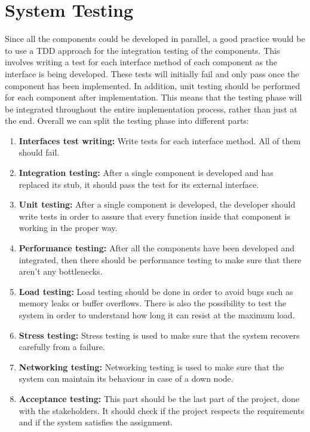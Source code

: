 \section{System Testing}
\label{sec:systemTesting}%
Since all the components could be developed in parallel, a good practice would be to use a TDD approach for the integration testing of the components. This involves writing a test for each interface method of each component as the interface is being developed. These tests will initially fail and only pass once the component has been implemented. In addition, unit testing should be performed for each component after implementation. This means that the testing phase will be integrated throughout the entire implementation process, rather than just at the end.
Overall we can split the testing phase into different parts:
\begin{enumerate}
    \item \textbf{Interfaces test writing: }Write tests for each interface method. All of them should fail.
    \item \textbf{Integration testing: }After a single component is developed and has replaced its stub, it should pass the test for its external interface.
    \item \textbf{Unit testing: }After a single component is developed, the developer should write tests in order to assure that every function inside that component is working in the proper way.
    \item \textbf{Performance testing: }After all the components have been developed and integrated, then there should be performance testing to make sure that there aren't any bottlenecks.
    \item \textbf{Load testing: }Load testing should be done in order to avoid bugs such as memory leaks or buffer overflows. There is also the possibility to test the system in order to understand how long it can resist at the maximum load.
    \item \textbf{Stress testing: }Stress testing is used to make sure that the system recovers carefully from a failure.
    \item \textbf{Networking testing: }Networking testing is used to make sure that the system can maintain its behaviour in case of a down node.
    \item \textbf{Acceptance testing: }This part should be the last part of the project, done with the stakeholders. It should check if the project respects the requirements and if the system satisfies the assignment.
\end{enumerate}